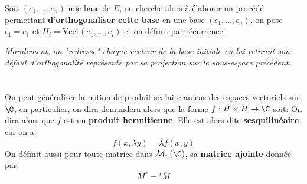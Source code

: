 \subsection*{}
Soit \((e_1, \ldots, e_n)\) une base de \(E\), on cherche alors à élaborer un procédé permettant \textbf{d'orthogonaliser cette base} en une base \((\epsilon_1, \ldots, \epsilon_n)\), on pose \(\epsilon_1 = e_1\) et \(H_i = \text{Vect}(e_1, \ldots, e_i)\) et on définit par récurrence:

\begin{center}
   \textit{Moralement, on "redresse" chaque vecteur de la base initiale en lui retirant son défaut d'orthogonalité représenté par sa projection sur le sous-espace précédent.}
\end{center}

\chapter*{}
On peut généraliser la notion de produit scalaire au cas des espaces vectoriels sur \(\C\), en particulier, on dira demandera alors que la forme \(f : H\times H \rightarrow \C\) soit:
On dira alors que \(f\) est un \textbf{produit hermitienne}. Elle est alors dite \textbf{sesquilinéaire} car on a:
\[
   f(x, \lambda y) = \overline{\lambda}f(x, y)
\]
On définit aussi pour toute matrice dans \(\mathcal{M}_n(\C)\), sa \textbf{matrice ajointe} donnée par:
\[
   M^* = {}^t\overline{M}
\]
